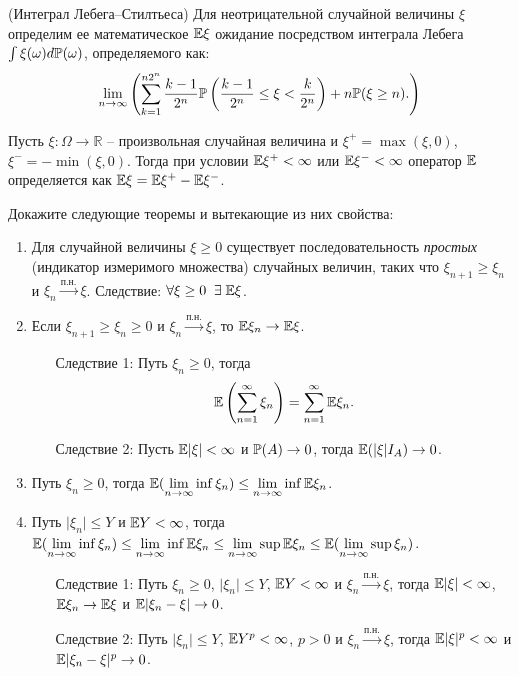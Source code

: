 \begin{problem}(Интеграл Лебега--Стилтьеса)
Для неотрицательной случайной величины $\xi$ определим ее математическое $\mathrm{{\mathbb E}} \xi$ ожидание посредством интеграла Лебега $\int \xi(\omega) d\mathrm{{\mathbb P}}(\omega)$, определяемого как:
\[
\lim \limits_{n \to \infty} \left(
  \sum \limits_{k = 1}^{n 2^n} \frac{k-1}{2^n} \mathrm{{\mathbb P}}\left(  \frac{k-1}{2^n} \leq \xi <  \frac{k}{2^n}  \right) + n \mathrm{{\mathbb P}}(\xi \geq n). 
\right)
\] 

\noindent Пусть $\xi: \Omega \to \mathbb{R}$ -- произвольная случайная величина и $\xi^{+} = \max (\xi, 0)$, $\xi^{-} = - \min (\xi, 0)$. Тогда при условии $\mathrm{{\mathbb E}} \xi^{+} < \infty$ или $\mathrm{{\mathbb E}} \xi^{-} < \infty$ оператор $\mathrm{{\mathbb E}}$ определяется как 
$\mathrm{{\mathbb E}} \xi = \mathrm{{\mathbb E}} \xi^{+} - \mathrm{{\mathbb E}} \xi^{-}$. 

Докажите следующие теоремы и вытекающие из них свойства:

\begin{enumerate}
\item Для случайной величины $\xi \geq 0$ существует последовательность \textit{простых} (индикатор измеримого множества) случайных величин, таких что $\xi_{n+1} \geq \xi_n$ и $\xi_n \mathop{\longrightarrow} \limits^{\text{п.н.}} \xi$. Следствие: $\forall \xi \geq 0 \;\; \exists \; \mathrm{{\mathbb E}} \xi$.
\item Если  $\xi_{n+1} \geq \xi_n \geq 0$ и $\xi_n \mathop{\longrightarrow} \limits^{\text{п.н.}} \xi$, то $\mathrm{{\mathbb E}} \xi_n \to \mathrm{{\mathbb E}} \xi$. 
\begin{enumerate}
\item[Следствие 1:] Путь $\xi_n \geq 0$, тогда 
\[ \mathrm{{\mathbb E}}\left(\sum \limits_{n=1}^{\infty} \xi_n \right) = \sum \limits_{n=1}^{\infty} \mathrm{{\mathbb E}} \xi_n. \]
\item[Следствие 2:] Пусть $\mathrm{{\mathbb E}} \vert \xi \vert < \infty$ и $\mathrm{{\mathbb P}}(A) \to 0$, тогда $\mathrm{{\mathbb E}} (\vert \xi \vert I_A) \to 0$. 
\end{enumerate}
\item Путь $\xi_n \geq 0$, тогда $\mathrm{{\mathbb E}} (\lim \limits_{n\to\infty} \inf \xi_n) \leq \lim \limits_{n\to\infty} \inf \mathrm{{\mathbb E}} \xi_n$. 
\item Путь $\vert \xi_n \vert \leq Y$ и $\mathrm{{\mathbb E}} Y < \infty$, тогда $\mathrm{{\mathbb E}} (\lim \limits_{n\to\infty} \inf \xi_n) \leq \lim \limits_{n\to\infty} \inf \mathrm{{\mathbb E}} \xi_n  \leq \lim \limits_{n\to\infty} \sup \mathrm{{\mathbb E}} \xi_n  \leq \mathrm{{\mathbb E}} (\lim \limits_{n\to\infty} \sup \xi_n)$.
\begin{enumerate}
\item[Следствие 1:] Путь $\xi_n \geq 0$, $\vert \xi_n \vert \leq Y$, $\mathrm{{\mathbb E}} Y < \infty$ и $\xi_n \mathop{\longrightarrow} \limits^{\text{п.н.}} \xi$, тогда $\mathrm{{\mathbb E}} \vert \xi \vert < \infty$, $\mathrm{{\mathbb E}} \xi_n \to \mathrm{{\mathbb E}} \xi$ и $\mathrm{{\mathbb E}} \vert \xi_n - \xi \vert \to 0$.
\item[Следствие 2:] Путь $\vert \xi_n \vert \leq Y$, $\mathrm{{\mathbb E}} Y^p < \infty$, $p >0$ и $\xi_n \mathop{\longrightarrow} \limits^{\text{п.н.}} \xi$, тогда $\mathrm{{\mathbb E}} \vert \xi \vert^p < \infty$ и $\mathrm{{\mathbb E}} \vert \xi_n - \xi \vert^p \to 0$. 
\end{enumerate}
\end{enumerate} 

\end{problem}

